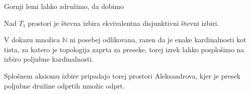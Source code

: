



Gornji lemi lahko združimo, da dobimo
\begin{trditev}
  Nad \(T₁\) prostori je števna izbira ekvivalentna disjunktivni števni izbiri.
\end{trditev}
\begin{opomba}
  V dokazu množica \(ℕ\) ni posebej odlikovana, razen da je enake kardinalnosti
  kot tista, za katero je topologija zaprta za preseke, torej izrek lahko
  posplošimo na izbiro poljubne kardinalnosti.

  Splošnem aksiomu izbire pripadajo torej prostori Aleksandrova, kjer je presek
  poljubne družine odprtih množic odprt.
\end{opomba}


